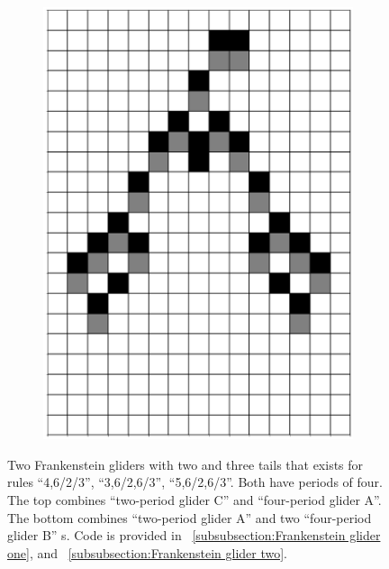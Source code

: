 \documentclass[12pt]{article}
\numberwithin{figure}{section} %
\begin{document}
\begin{figure}[H]
\begin{subfigure}{0.19\textwidth}
     		\includegraphics[width=\linewidth]{Section4/26.4}
     		\subcaption{}
   	\end{subfigure}
   	\setcounter{subfigure}{0}
	\caption[Frankenstein gliders]{Two Frankenstein gliders with two and three tails that exists for rules “4,6/2/3”, “3,6/2,6/3”, “5,6/2,6/3”. Both have periods of four. The top combines “two-period glider C” and “four-period glider A”. The bottom combines “two-period glider A” and two “four-period glider B” s. Code is provided in ~\ref{subsubsection:Frankenstein glider one}, and ~\ref{subsubsection:Frankenstein glider two}.}
	\label{fig:Frankenstein gliders}
\end{figure}
\end{document}
